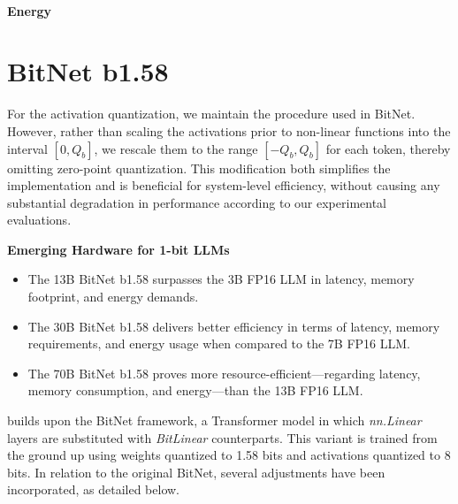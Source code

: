 \paragraph{Energy}

\section{BitNet b1.58}

For the activation quantization, we maintain the procedure used in BitNet. However, rather than scaling the activations prior to non-linear functions into the interval $[0, Q_b]$, we rescale them to the range $[-Q_b, Q_b]$ for each token, thereby omitting zero-point quantization. This modification both simplifies the implementation and is beneficial for system-level efficiency, without causing any substantial degradation in performance according to our experimental evaluations.


\begin{abstract}
Recent advancements, exemplified by BitNet~\cite{bitnet}, are heralding a transformative period characterized by 1-bit Large Language Models (LLMs). In this paper, we present \textbf{}, a 1-bit LLM variant where each model parameter is limited to ternary values drawn from \{-1, 0, 1\}. This approach achieves parity with conventional full-precision Transformer LLMs—those trained in FP16 or BF16—regarding both perplexity and downstream task results, provided model size and training data are kept constant. Moreover, this methodology offers substantial reductions in latency, memory footprint, throughput limitations, and energy demands. Importantly, the 1.58-bit LLM introduces an updated scaling law along with methodologies for the next wave of LLMs that aim for both superior performance and efficiency. Beyond algorithmic advancements, it encourages new computational strategies and paves the way for the development of hardware purpose-built for 1-bit LLMs.
\end{abstract}

\textbf{Emerging Hardware for 1-bit LLMs}

\begin{itemize}
    \item The 13B BitNet b1.58 surpasses the 3B FP16 LLM in latency, memory footprint, and energy demands.
    \item The 30B BitNet b1.58 delivers better efficiency in terms of latency, memory requirements, and energy usage when compared to the 7B FP16 LLM.
    \item The 70B BitNet b1.58 proves more resource-efficient—regarding latency, memory consumption, and energy—than the 13B FP16 LLM.
\end{itemize}

 builds upon the BitNet framework, a Transformer model in which \emph{nn.Linear} layers are substituted with \emph{BitLinear} counterparts. This variant is trained from the ground up using weights quantized to 1.58 bits and activations quantized to 8 bits. In relation to the original BitNet, several adjustments have been incorporated, as detailed below.